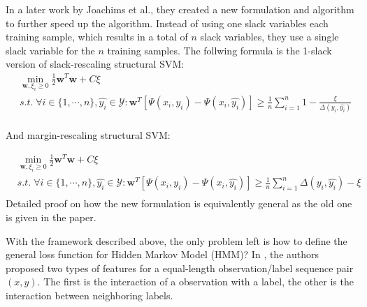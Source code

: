 In a later work by Joachims et al.\cite{svm2009}, they created a new formulation and algorithm to further speed up the algorithm. Instead of using one slack variables each training sample, which results in a total of $n$ slack variables, they use a single slack variable for the $n$ training samples. The follwing formula is the 1-slack version of slack-rescaling structural SVM:
$$
\begin{aligned}
    & \min_{\mathbf{w}, \xi_i \geq 0} \frac{1}{2}\mathbf{w}^T\mathbf{w} + C \xi\\
    &s.t.\; \forall i \in \{1,\cdots,n\},\hat{y_i} \in \mathcal{Y}: \mathbf{w}^T[\Psi(x_i,y_i) - \Psi(x_i,\hat{y_i})] \geq \frac{1}{n}\sum^n_{i=1}1 - \frac{\xi}{\Delta(y_i, \hat{y_i})} \\
\end{aligned}
$$

And margin-rescaling structural SVM:

$$
\begin{aligned}
    & \min_{\mathbf{w}, \xi_i \geq 0} \frac{1}{2}\mathbf{w}^T\mathbf{w} + C \xi\\
    & s.t.\; \forall i \in \{1,\cdots,n\},\hat{y_i} \in \mathcal{Y}: \mathbf{w}^T[\Psi(x_i,y_i) - \Psi(x_i,\hat{y_i})] \geq \frac{1}{n}\sum^n_{i=1}\Delta(y_i, \hat{y_i}) - \xi \\
\end{aligned}
$$
%
Detailed proof on how the new formulation is equivalently general as the old one is given in the paper.

With the framework described above, the only problem left is how to define the general loss function for Hidden Markov Model (HMM)? In \cite{svm2003}, the authors proposed two types of features for a equal-length observation/label sequence pair $(x,y)$. The first is the interaction of a observation with a label, the other is the interaction between neighboring labels. 

